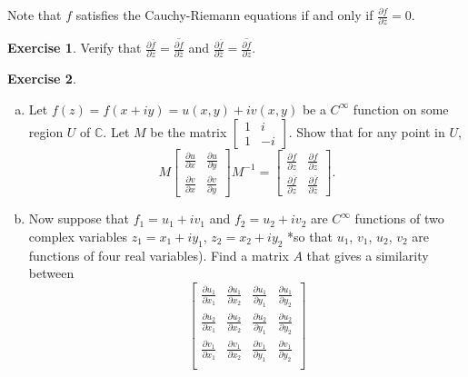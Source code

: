 \documentclass[12pt]{article}
\newcommand{\cx}{\mathbb{C}}
\newcommand\inv[1]{#1^{-1}}
\theoremstyle{definition}
\newtheorem{exercise}{Exercise}
\theoremstyle{remark}
\begin{document}
Note that $f$ satisfies the Cauchy-Riemann equations if and only if $\frac{\partial f}{\partial \overline{z}} = 0$.
\begin{exercise}
    Verify that $\frac{\partial \overline{f}}{\partial z} = \overline{\frac{\partial f}{\partial \overline{z}}}$ and $\frac{\partial \overline{f}}{\partial \overline{z}} = \overline{\frac{\partial f}{\partial z}}$.
\end{exercise}
\begin{exercise}
    \noindent
    \begin{enumerate}[(a)]
        \item Let $f(z) = f(x + iy) = u(x,y) + iv(x,y)$ be a $C^{\infty}$ function on some region $U$ of $\cx$. Let $M$ be the matrix $\begin{bmatrix} 1 & i \\ 1 & -i \end{bmatrix}$. Show that for any point in $U$,
        \[
            M 
            \begin{bmatrix}
                \frac{\partial u}{\partial x} & \frac{\partial u}{\partial y} \\[0.5em]
                \frac{\partial v}{\partial x} & \frac{\partial v}{\partial y}
            \end{bmatrix}
            \inv{M} = 
            \begin{bmatrix}
                \frac{\partial f}{\partial z} & \frac{\partial f}{\partial \overline{z}} \\[0.5em]
                \frac{\partial \overline{f}}{\partial z} & \frac{\partial \overline{f}}{\partial \overline{z}}
            \end{bmatrix}.
        \]
        \item Now suppose that $f_1 = u_1 + iv_1$ and $f_2 = u_2 + iv_2$ are $C^{\infty}$ functions of two complex variables $z_1 = x_1 + iy_1$, $z_2 = x_2 + iy_2$ *so that $u_1$, $v_1$, $u_2$, $v_2$ are functions of four real variables). Find a matrix $A$ that gives a similarity between
        \[
            \begin{bmatrix}
                \frac{\partial u_1}{\partial x_1} & \frac{\partial u_1}{\partial x_2} & \frac{\partial u_1}{\partial y_1} & \frac{\partial u_1}{\partial y_2} \\[0.5em]
                \frac{\partial u_2}{\partial x_1} & \frac{\partial u_2}{\partial x_2} & \frac{\partial u_2}{\partial y_1} & \frac{\partial u_2}{\partial y_2} \\[0.5em]
                \frac{\partial v_1}{\partial x_1} & \frac{\partial v_1}{\partial x_2} & \frac{\partial v_1}{\partial y_1} & \frac{\partial v_1}{\partial y_2} \\[0.5em]

\end{bmatrix}\]
\end{enumerate}
\end{exercise}
\end{document}
